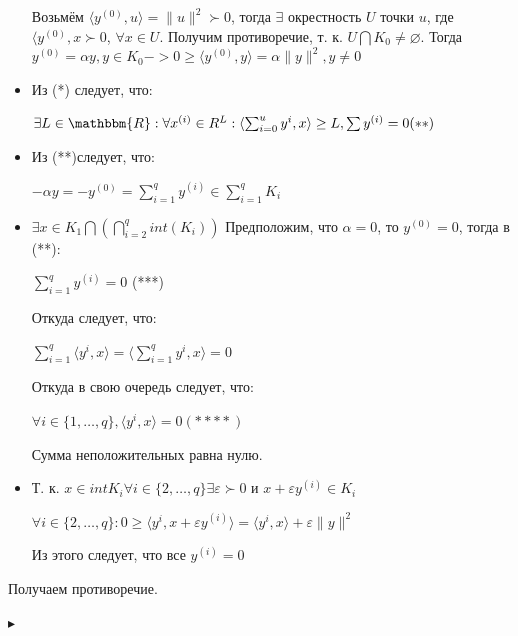 \begin{itemize}
Возьмём  $\langle y^{(0)},u\rangle=\|u\|^2\succ 0$, тогда $\exists$ окрестность $U$ точки $u$, где $\langle y^{(0)},x\succ 0$, $\forall x\in U$. Получим противоречие, т. к. $U\bigcap K_0\neq\varnothing$.
Тогда $y^{(0)}=\alpha y, y\in K_0 -> 0\geq \langle y^{(0)},y\rangle=\alpha\|y\|^2, y\neq 0$

\item Из (*) следует, что:
\begin{center}
     $\exists L\in\mathbbm{R}: \forall x^{(i)}\in R^{L} :
\langle \sum_{i=0}^{u}{y^{i}},x\rangle \geq L,  \sum{y^{(i)}}=0 (**)$
\end{center}

\item Из (**)следует, что:
\begin{center}
    $-\alpha y=-y^{(0)}=\sum_{i=1}^{q}{y^{(i)}}\in \sum_{i=1}^{q}{K_i}$
\end{center}

\item $\exists x\in K_1\bigcap(\bigcap_{i=2}^{q}{int(K_i)})$
Предположим, что $\alpha =0$, то $y^(0)=0$, тогда в (**):
\begin{center}
    $\sum_{i=1}^{q}{y^{(i)}}=0$ (***)
\end{center}
Откуда следует, что:
 \begin{center}
    $\sum_{i=1}^{q}{\langle {y^{i}},x\rangle}=\langle \sum_{i=1}^{q}{y^{i}},x\rangle=0$
\end{center}
Откуда в свою очередь следует, что:
\begin{center}
    $\forall i\in\{1,\ldots,q\},\langle {y^{i}},x\rangle=0 (****)$
\end{center}
Сумма неположительных равна нулю.

\item Т. к. $x\in int K_i \forall i\in\{2,\ldots,q\}\exists \varepsilon\succ0
$
и $x+\varepsilon y^{(i)}\in K_i $

$\forall i\in\{2, \dots, q\} : 0\geq \langle {y^{i}},x+\varepsilon y^{(i)}\rangle= \langle {y^{i}},x\rangle+\varepsilon \|y\|^2\ $

Из этого следует, что все $y^{(i)}=0$
\end{itemize}

Получаем противоречие.

$\blacktriangleright$ 